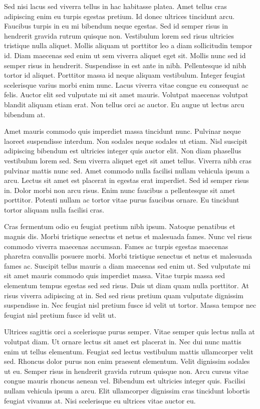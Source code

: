 \documentclass[11pt,a4paper]{article}
\begin{document}
Sed nisi lacus sed viverra tellus in hac habitasse platea. Amet tellus cras adipiscing enim eu turpis egestas pretium. Id donec ultrices tincidunt arcu. Faucibus turpis in eu mi bibendum neque egestas. Sed id semper risus in hendrerit gravida rutrum quisque non. Vestibulum lorem sed risus ultricies tristique nulla aliquet. Mollis aliquam ut porttitor leo a diam sollicitudin tempor id. Diam maecenas sed enim ut sem viverra aliquet eget sit. Mollis nunc sed id semper risus in hendrerit. Suspendisse in est ante in nibh. Pellentesque id nibh tortor id aliquet. Porttitor massa id neque aliquam vestibulum. Integer feugiat scelerisque varius morbi enim nunc. Lacus viverra vitae congue eu consequat ac felis. Auctor elit sed vulputate mi sit amet mauris. Volutpat maecenas volutpat blandit aliquam etiam erat. Non tellus orci ac auctor. Eu augue ut lectus arcu bibendum at.

Amet mauris commodo quis imperdiet massa tincidunt nunc. Pulvinar neque laoreet suspendisse interdum. Non sodales neque sodales ut etiam. Nisl suscipit adipiscing bibendum est ultricies integer quis auctor elit. Non diam phasellus vestibulum lorem sed. Sem viverra aliquet eget sit amet tellus. Viverra nibh cras pulvinar mattis nunc sed. Amet commodo nulla facilisi nullam vehicula ipsum a arcu. Lectus sit amet est placerat in egestas erat imperdiet. Sed id semper risus in. Dolor morbi non arcu risus. Enim nunc faucibus a pellentesque sit amet porttitor. Potenti nullam ac tortor vitae purus faucibus ornare. Eu tincidunt tortor aliquam nulla facilisi cras.

Cras fermentum odio eu feugiat pretium nibh ipsum. Natoque penatibus et magnis dis. Morbi tristique senectus et netus et malesuada fames. Nunc vel risus commodo viverra maecenas accumsan. Fames ac turpis egestas maecenas pharetra convallis posuere morbi. Morbi tristique senectus et netus et malesuada fames ac. Suscipit tellus mauris a diam maecenas sed enim ut. Sed vulputate mi sit amet mauris commodo quis imperdiet massa. Vitae turpis massa sed elementum tempus egestas sed sed risus. Duis ut diam quam nulla porttitor. At risus viverra adipiscing at in. Sed sed risus pretium quam vulputate dignissim suspendisse in. Nec feugiat nisl pretium fusce id velit ut tortor. Massa tempor nec feugiat nisl pretium fusce id velit ut.

Ultrices sagittis orci a scelerisque purus semper. Vitae semper quis lectus nulla at volutpat diam. Ut ornare lectus sit amet est placerat in. Nec dui nunc mattis enim ut tellus elementum. Feugiat sed lectus vestibulum mattis ullamcorper velit sed. Rhoncus dolor purus non enim praesent elementum. Velit dignissim sodales ut eu. Semper risus in hendrerit gravida rutrum quisque non. Arcu cursus vitae congue mauris rhoncus aenean vel. Bibendum est ultricies integer quis. Facilisi nullam vehicula ipsum a arcu. Elit ullamcorper dignissim cras tincidunt lobortis feugiat vivamus at. Nisi scelerisque eu ultrices vitae auctor eu.
\end{document}
